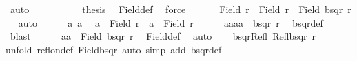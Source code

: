 \begin{isabellebody}
\ auto\isanewline
\ \ \ \ \isacommand{{\isacharbraceright}{\kern0pt}}\isamarkupfalse%
\isanewline
\ \ \ \ \isamarkupfalse%
\ {\isacharquery}{\kern0pt}thesis\ \isamarkupfalse%
\ Field{\isacharunderscore}{\kern0pt}def\ \isamarkupfalse%
\ force\isanewline
\ \ \isamarkupfalse%
\isanewline
{}\isamarkupfalse%
\isanewline
\ \ \isamarkupfalse%
\ {\isachardoublequoteopen}Field\ r\ {\isasymtimes}\ Field\ r\ {\isasymle}\ Field\ {\isacharparenleft}{\kern0pt}bsqr\ r{\isacharparenright}{\kern0pt}{\isachardoublequoteclose}\isanewline
\ \ \isamarkupfalse%
{\isacharparenleft}{\kern0pt}auto{\isacharparenright}{\kern0pt}\isanewline
\ \ \ \ \isamarkupfalse%
\ a{}\ a{}\ \isamarkupfalse%
\ {\isachardoublequoteopen}a{}\ {\isasymin}\ Field\ r{\isachardoublequoteclose}\ \ {\isachardoublequoteopen}a{}\ {\isasymin}\ Field\ r{\isachardoublequoteclose}\isanewline
\ \ \ \ \isamarkupfalse%
\ {\isachardoublequoteopen}{\isacharparenleft}{\kern0pt}{\isacharparenleft}{\kern0pt}a{}{\isacharcomma}{\kern0pt}a{}{\isacharparenright}{\kern0pt}{\isacharcomma}{\kern0pt}{\isacharparenleft}{\kern0pt}a{}{\isacharcomma}{\kern0pt}a{}{\isacharparenright}{\kern0pt}{\isacharparenright}{\kern0pt}\ {\isasymin}\ bsqr\ r{\isachardoublequoteclose}\ \isamarkupfalse%
\ bsqr{\isacharunderscore}{\kern0pt}def\ \isamarkupfalse%
\ blast\isanewline
\ \ \ \ \isamarkupfalse%
\ {\isachardoublequoteopen}{\isacharparenleft}{\kern0pt}a{}{\isacharcomma}{\kern0pt}a{}{\isacharparenright}{\kern0pt}\ {\isasymin}\ Field\ {\isacharparenleft}{\kern0pt}bsqr\ r{\isacharparenright}{\kern0pt}{\isachardoublequoteclose}\ \isamarkupfalse%
\ Field{\isacharunderscore}{\kern0pt}def\ \isamarkupfalse%
\ auto\isanewline
\ \ \isamarkupfalse%
\isanewline
{}\isamarkupfalse%
%
\endisatagproof
{\isafoldproof}%
%
\isadelimproof
\isanewline
%
\endisadelimproof
\isanewline
{}\isamarkupfalse%
\ bsqr{\isacharunderscore}{\kern0pt}Refl{\isacharcolon}{\kern0pt}\ {\isachardoublequoteopen}Refl{\isacharparenleft}{\kern0pt}bsqr\ r{\isacharparenright}{\kern0pt}{\isachardoublequoteclose}\isanewline
%
\isadelimproof
%
\endisadelimproof
%
\isatagproof
{}\isamarkupfalse%
{\isacharparenleft}{\kern0pt}unfold\ refl{\isacharunderscore}{\kern0pt}on{\isacharunderscore}{\kern0pt}def\ Field{\isacharunderscore}{\kern0pt}bsqr{\isacharcomma}{\kern0pt}\ auto\ simp\ add{\isacharcolon}{\kern0pt}\ bsqr{\isacharunderscore}{\kern0pt}def{\isacharparenright}{\kern0pt}%

\end{isabellebody}
